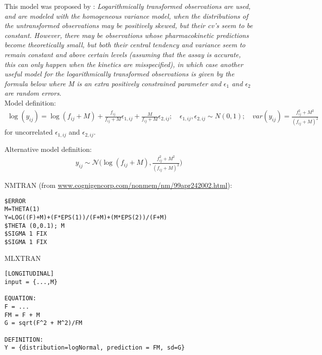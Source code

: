 This model was proposed by \cite{Beal:2001}: \emph{Logarithmically 
transformed observations are used, and are modeled with the 
homogeneous variance model, when the distributions of the untransformed 
observations may be positively skewed, but their cv's seem to be constant. 
However, there may be observations whose pharmacokinetic
predictions become theoretically small, but both their central tendency
and variance seem to remain constant and above certain levels
(assuming that the assay is accurate, this can only happen when the kinetics
are misspecified), in which case another useful model for the logarithmically
transformed observations is given by the formula below where M is an extra 
positively constrained parameter and $\epsilon_1$ and $\epsilon_2$ are random errors}.\\

\smallskip
Model definition:
\bigskip
\begin{eqnarray}
\log(y_{ij}) =  \log(f_{ij}+M) + \frac{f_{ij}}{f_{ij}+M} \epsilon_{1,ij} + \frac{M}{f_{ij}+M} \epsilon_{2,ij}; \quad \epsilon_{1,ij}, \epsilon_{2,ij}\sim N(0,1); \quad \mathit{var}(y_{ij}) = \frac{f_{ij}^2 + M^2}{(f_{ij}+M)^2}\nonumber
\end{eqnarray}
for uncorrelated $\epsilon_{1,ij}$ and $\epsilon_{2,ij}$.
\bigskip

Alternative model definition:
\begin{eqnarray}
y_{ij} \sim \mathcal{N}\Big( \log(f_{ij}+M), \frac{f_{ij}^2 + M^2}{(f_{ij}+M)^2} \Big) \nonumber
\end{eqnarray}

\bigskip
\begin{lrbox}{\lstbox}\begin{minipage}{16cm}
NMTRAN
(from \url{www.cognigencorp.com/nonmem/nm/99apr242002.html}):
\begin{lstlisting}[frame=single,language=NM]
$ERROR
M=THETA(1)
Y=LOG((F)+M)+(F*EPS(1))/(F+M)+(M*EPS(2))/(F+M)
$THETA (0,0.1); M
$SIGMA 1 FIX
$SIGMA 1 FIX
\end{lstlisting}   
\end{minipage}\end{lrbox}
\usebox\lstbox



\begin{lrbox}{\lstbox}\begin{minipage}{16cm}
MLXTRAN
\begin{lstlisting}[frame=single,language=MLX]
[LONGITUDINAL]
input = {...,M}

EQUATION:
F = ...
FM = F + M
G = sqrt(F^2 + M^2)/FM

DEFINITION:
Y = {distribution=logNormal, prediction = FM, sd=G}
\end{lstlisting}   
\end{minipage}\end{lrbox}
\usebox\lstbox


